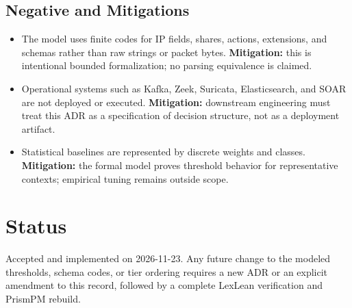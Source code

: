 \documentclass[11pt]{article}
\begin{document}
\subsection{Negative and Mitigations}

\begin{itemize}
  \item The model uses finite codes for IP fields, shares, actions, extensions, and schemas rather
        than raw strings or packet bytes. \textbf{Mitigation:} this is intentional bounded
        formalization; no parsing equivalence is claimed.
  \item Operational systems such as Kafka, Zeek, Suricata, Elasticsearch, and SOAR are not deployed
        or executed. \textbf{Mitigation:} downstream engineering must treat this ADR as a
        specification of decision structure, not as a deployment artifact.
  \item Statistical baselines are represented by discrete weights and classes. \textbf{Mitigation:}
        the formal model proves threshold behavior for representative contexts; empirical tuning
        remains outside scope.
\end{itemize}

\section{Status}

Accepted and implemented on 2026-11-23. Any future change to the modeled thresholds, schema codes,
or tier ordering requires a new ADR or an explicit amendment to this record, followed by a complete
LexLean verification and PrismPM rebuild.
\end{document}
